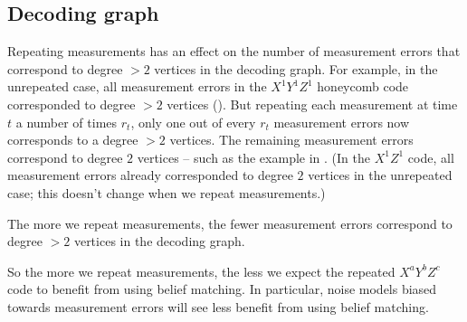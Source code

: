 \subsection{Decoding graph}\label{subsec:repeating_measurements_decoding_graph}

Repeating measurements has an effect on the number of measurement errors that correspond to degree $> 2$ vertices in the decoding graph.
For example, in the unrepeated case, all measurement errors in the $X^1 Y^1 Z^1$ honeycomb code corresponded to degree $> 2$ vertices ().
But repeating each measurement at time $t$ a number of times $r_t$,
only one out of every $r_t$ measurement errors now corresponds to a degree $> 2$ vertices.
The remaining measurement errors correspond to degree $2$ vertices -- such as the example in .
(In the $X^1 Z^1$ code, all measurement errors already corresponded to degree $2$ vertices in the unrepeated case;
this doesn't change when we repeat measurements.)

\begin{difference}\label{dif:repeated_meas_errors_hyperedges}
The more we repeat measurements, the fewer measurement errors correspond to degree $> 2$ vertices in the decoding graph.
\end{difference}

So the more we repeat measurements, the less we expect the repeated $X^a Y^b Z^c$ code to benefit from using belief matching.
In particular, noise models biased towards measurement errors will see less benefit from using belief matching.

